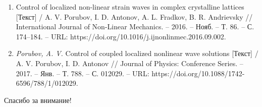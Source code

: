 \begin{frame}
\begin{tiny}
\begin{enumerate}
	\item Control of localized non-linear strain waves in complex crystalline lattices [Текст] / A. V. Porubov, I. D. Antonov, A. L. Fradkov, B. R. Andrievsky // International Journal of Non-Linear Mechanics. -- 2016. -- Нояб. -- Т. 86. -- С. 174--184. -- URL: https://doi.org/10.1016/j.ijnonlinmec.2016.09.002.
	
	\item \textit{Porubov, A. V.} Control of coupled localized nonlinear wave solutions [Текст] / A. V. Porubov, I. D. Antonov // Journal of Physics: Conference Series. -- 2017. -- Янв. -- Т. 788. -- С. 012029. -- URL: https://doi.org/10.1088/1742-6596/788/1/012029.
	
\end{enumerate}
\end{tiny}
\end{frame}

\begin{frame} %
	\begin{center}
		\Huge
		Спасибо за внимание!
	\end{center}
\end{frame}

